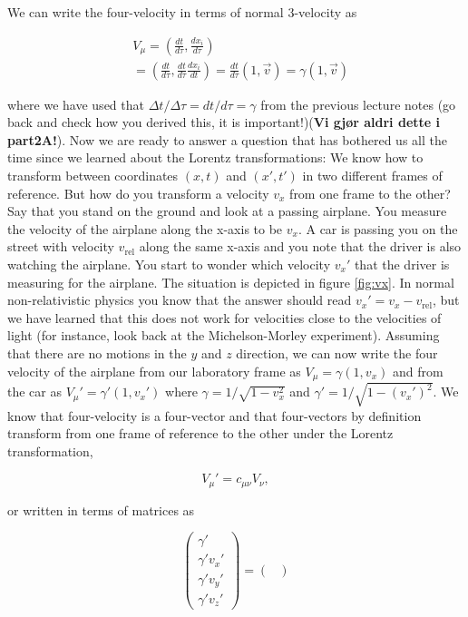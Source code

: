 {\begin{multicols}{2}
We can write the four-velocity in terms of normal 3-velocity as
\begin{formbox}
\begin{align*}
&V_\mu=(\frac{dt}{d\tau},\frac{dx_i}{d\tau})\\
&=(\frac{dt}{d\tau},\frac{dt}{d\tau}\frac{dx_i}{dt})=\frac{dt}{d\tau}(1,\vec{v})=\gamma(1,\vec{v})
\end{align*}
\end{formbox}
where we have used that $\Delta t/\Delta\tau=dt/d\tau=\gamma$ from the previous lecture notes (go back and check how you derived this, it is important!)(\textbf{Vi gjør aldri dette i part2A!}). Now we are ready to answer a question that has bothered us all the time since we learned about the Lorentz transformations: We know how to transform between coordinates $(x,t)$  and $(x',t')$ in two different frames of reference. But how do you transform a velocity $v_x$ from one frame to the other? Say that you stand on the ground and look at a passing airplane. You measure the velocity of the airplane along the x-axis to be $v_x$. A car is passing you on the street with velocity $v_\mathrm{rel}$ along the same x-axis and you note that the driver is also watching the airplane. You start to wonder which velocity $v_x'$ that the driver is measuring for the airplane. The situation is depicted in figure \ref{fig:vx}. In normal non-relativistic physics you know that the answer should read $v_x'=v_x-v_\mathrm{rel}$, but we have learned that this does not work for velocities close to the velocities of light (for instance, look back at the Michelson-Morley experiment). Assuming that there are no motions in the $y$ and $z$ direction, we can now write the four velocity of the airplane from our laboratory frame as $V_\mu=\gamma(1,v_x)$ and from the car as $V_\mu'=\gamma'(1,v_x')$ where $\gamma=1/\sqrt{1-v_x^2}$ and $\gamma'=1/\sqrt{1-(v_x')^2}$. We know that four-velocity is a four-vector and that four-vectors by definition transform from one frame of reference to the other under the Lorentz transformation,
\begin{formbox}
\[
V_\mu'=c_{\mu\nu}V_\nu,
\]
\end{formbox}
or written in terms of matrices as
\begin{formbox}
\[
\begin{pmatrix}
\gamma'\\
\gamma'v_x'\\
\gamma'v_y'\\
\gamma'v_z'
\end{pmatrix}
=
\begin{pmatrix}

\end{pmatrix}\]
\end{formbox}
\end{multicols}}
